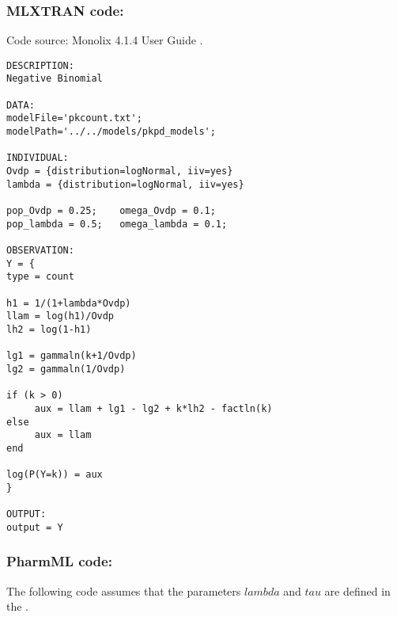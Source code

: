 \myEndLine

\subsubsection{MLXTRAN code:}
Code source: Monolix 4.1.4 User Guide \cite{Monolix4.1.4UserGuide:2012}.

\myStartLine

\lstset{language=MLXTRANcode}
\begin{lstlisting}
DESCRIPTION:
Negative Binomial 

DATA:
modelFile='pkcount.txt';
modelPath='../../models/pkpd_models';

INDIVIDUAL:
Ovdp = {distribution=logNormal, iiv=yes}
lambda = {distribution=logNormal, iiv=yes}

pop_Ovdp = 0.25;    omega_Ovdp = 0.1;
pop_lambda = 0.5;   omega_lambda = 0.1;

OBSERVATION:
Y = {
type = count

h1 = 1/(1+lambda*Ovdp) 
llam = log(h1)/Ovdp 
lh2 = log(1-h1)

lg1 = gammaln(k+1/Ovdp) 
lg2 = gammaln(1/Ovdp)

if (k > 0) 
     aux = llam + lg1 - lg2 + k*lh2 - factln(k)
else 
     aux = llam
end 

log(P(Y=k)) = aux
}

OUTPUT: 
output = Y
\end{lstlisting}

\myEndLine

\subsubsection{PharmML code:}
The following code assumes that the parameters $lambda$ and $tau$ are defined in the .

